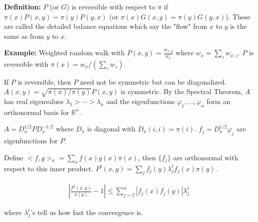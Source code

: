 \documentclass{article}
\newcommand{\ld}{\lambda}
\newcommand{\ph}{\varphi}
\newcommand{\R}{{\mathbb{R}}}
\begin{document}
\vspace{5mm}
\textbf{Definition:} $P$ (or $G$) is reversible with respect to $\pi$ if $\pi(x)P(x,y)=\pi(y)P(y,x)$ (or $\pi(x)G(x,y)=\pi(y)G(y,x)$). These are called the detailed balance equations which say the "flow" from $x$ to $y$ is the same as from $y$ to $x$. 

\vspace{5mm}
\textbf{Example:} Weighted random walk with $P(x,y)=\frac{w_{x,y}}{w_x}$ where $w_x=\sum_zw_{x,z}$. $P$ is reversible with $\pi(x)=w_x/\left(\sum_zw_z\right)$.

\vspace{5mm}
If $P$ is reversible, then $P$ need not be symmetric but can be diagonalized. $A(x,y)=\sqrt{\pi(x)/\pi(y)}P(x,y)$ is symmetric. By the Spectral Theorem, $A$ has real eigenvalues $\ld_1>\cdots>\ld_n$ and the eigenfunctions $\ph_1,\ldots,\ph_n$ form an orthonormal basis for $\R^n$.

\vspace{5mm}
$A=D_\pi^{1/2}PD_\pi^{-1/2}$ where $D_\pi$ is diagonal with $D_\pi(i,i)=\pi(i)$. $f_j=D_\pi^{1/2}\ph_j$ are eigenfunctions for $P$.

\vspace{5mm}
Define $<f,g>_\pi=\sum_xf(x)g(x)\pi(x)$, then $\{f_j\}$ are orthonormal with respect to this inner product. $P^t(x,y)=\sum_jf_j(y)\ld_j^tf_j(x)\pi(y)$.

$$\begin{aligned}
\left|\frac{P^t(x,y)}{\pi(y)}-1\right|\leq \sum_{j=2}^n|f_j(x)f_j(y)|\ld_j^t
\end{aligned}$$

where $\ld_j^t$'s tell us how fast the convergence is. 
\end{document}
